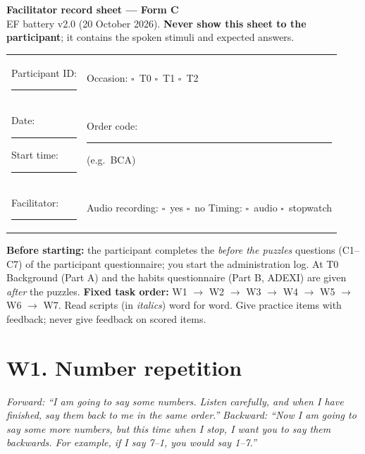 \documentclass[10pt,a4paper]{article}
\newcommand{\blank}[1][1.2cm]{\rule{#1}{0.4pt}}
\newcommand{\bx}{$\square$}
\begin{document}
\begin{center}{\LARGE\bfseries Facilitator record sheet --- Form C}\\[3pt]
{\small EF battery v2.0 (20 October 2026). \textbf{Never show this sheet to the participant}; it contains the spoken stimuli and expected answers.}\end{center}
\begin{tabular}{@{}p{8cm}p{8cm}@{}}
Participant ID: \blank[4cm] & Occasion: \bx\ T0 \quad \bx\ T1 \quad \bx\ T2\\
Date: \blank[4cm] \quad Start time: \blank[2cm] & Order code: \blank[2cm] (e.g.\ BCA)\\
Facilitator: \blank[4cm] & Audio recording: \bx\ yes \quad \bx\ no \quad Timing: \bx\ audio \bx\ stopwatch\\
\end{tabular}

\textbf{Before starting:} the participant completes the \emph{before the puzzles} questions (C1--C7) of the participant questionnaire; you start the administration log. At T0 Background (Part A) and the habits questionnaire (Part B, ADEXI) are given \emph{after} the puzzles.
\textbf{Fixed task order:} W1 $\rightarrow$ W2 $\rightarrow$ W3 $\rightarrow$ W4 $\rightarrow$ W5 $\rightarrow$ W6 $\rightarrow$ W7. Read scripts (in \textit{italics}) word for word. Give practice items with feedback; never give feedback on scored items.

\section*{W1. Number repetition}
\textit{Forward: ``I am going to say some numbers. Listen carefully, and when I have finished, say them back to me in the same order.''}
\textit{Backward: ``Now I am going to say some more numbers, but this time when I stop, I want you to say them backwards. For example, if I say 7--1, you would say 1--7.''}
\end{document}
